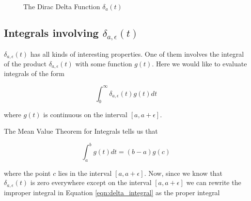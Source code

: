 \documentclass{article}
\theoremstyle{definition}
\begin{document}
\bigskip
\begin{figure}[H]
  \centering
  \caption{The Dirac Delta Function $\delta_{a}(t)$}
  \label{fig:delta_limit}
\end{figure}


\subsection{Integrals involving $\delta_{a,\epsilon}(t)$}
$\delta_{a,\epsilon}(t)$ has all kinds of interesting
properties. One of them involves the integral of the product
$\delta_{a,\epsilon}(t)$ with some function $g(t)$.  Here we
would like to evaluate integrals of the form

\bigskip
\begin{equation}
  \int_{0}^{\infty} \delta_{a,\epsilon}(t) g(t) dt
  \label{eqn:delta_integral}
\end{equation}

\bigskip
\noindent
where $g(t)$ is continuous on the interval $[a, a+\epsilon]$.  
 
\bigskip
\noindent
The Mean Value Theorem for Integrals
\cite{wiki:meam_value_theorem_for_integrals}  tells us that 

\begin{equation}
  \int_{a}^{b} g(t) dt = (b -a) g(c)
  \label{eqn:mvti}
\end{equation}

\bigskip
\noindent
where the point $c$ lies in the interval $[a, a+\epsilon]$. Now,
since we know that $\delta_{a,\epsilon}(t)$ is zero everywhere
except on the interval $[a, a+\epsilon]$ we can rewrite the
improper integral in Equation \ref{eqn:delta_integral} as the
proper integral
\end{document}
